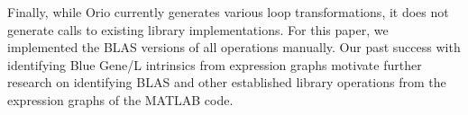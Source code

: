 \documentclass[runningheads]{llncs}
\begin{document}
Finally, while Orio currently generates various loop transformations, it does not generate calls to existing library implementations. For this paper, we implemented the BLAS versions of all operations manually. Our past success with identifying Blue Gene/L intrinsics from expression graphs motivate further research on identifying BLAS and other established library operations from the expression graphs of the MATLAB code.





\end{document}
